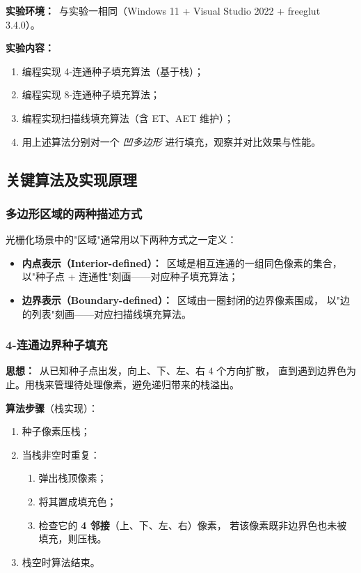 \documentclass[a4paper,12pt]{ctexart}
\begin{document}
\textbf{实验环境：}\ 与实验一相同（Windows 11 + Visual Studio 2022 + freeglut 3.4.0）。

\textbf{实验内容：}
\begin{enumerate}[leftmargin=2em,itemsep=0.2em]
    \item 编程实现 4-连通种子填充算法（基于栈）；
    \item 编程实现 8-连通种子填充算法；
    \item 编程实现扫描线填充算法（含 ET、AET 维护）；
    \item 用上述算法分别对一个 \emph{凹多边形} 进行填充，观察并对比效果与性能。
\end{enumerate}

\subsection{关键算法及实现原理}

\subsubsection{多边形区域的两种描述方式}

光栅化场景中的"区域"通常用以下两种方式之一定义：
\begin{itemize}[leftmargin=2em,itemsep=0.1em]
    \item \textbf{内点表示（Interior-defined）：}\ 区域是相互连通的一组同色像素的集合，
        以"种子点 + 连通性"刻画——对应种子填充算法；
    \item \textbf{边界表示（Boundary-defined）：}\ 区域由一圈封闭的边界像素围成，
        以"边的列表"刻画——对应扫描线填充算法。
\end{itemize}

\subsubsection{4-连通边界种子填充}

\textbf{思想：}\ 从已知种子点出发，向上、下、左、右 $4$ 个方向扩散，
直到遇到边界色为止。用栈来管理待处理像素，避免递归带来的栈溢出。

\textbf{算法步骤}（栈实现）：
\begin{enumerate}[leftmargin=2em,itemsep=0.2em]
    \item 种子像素压栈；
    \item 当栈非空时重复：
        \begin{enumerate}[label=(\alph*),leftmargin=2em]
            \item 弹出栈顶像素；
            \item 将其置成填充色；
            \item 检查它的 \textbf{4 邻接}（上、下、左、右）像素，
                若该像素既非边界色也未被填充，则压栈。
        \end{enumerate}
    \item 栈空时算法结束。
\end{enumerate}
\end{document}
